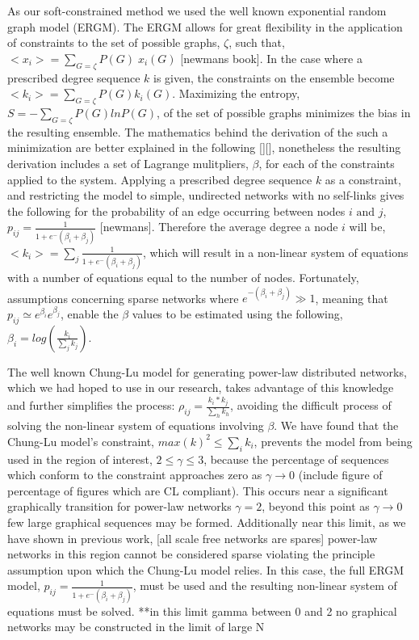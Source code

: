 \documentclass[aip,graphicx,amsmath]{revtex4-1}
\begin{document}
As our soft-constrained method we used the well known exponential random graph model (ERGM). The ERGM allows for great flexibility in the application of constraints to the set of possible graphs, $\zeta$, such that, $<x_i> = \displaystyle\sum_{G = \zeta} P(G)\;x_i(G)$ [newmans book]. In the case where a prescribed degree sequence $k$ is given, the constraints on the ensemble become $<k_i> = \displaystyle\sum_{G = \zeta} P(G) k_i(G)$. Maximizing the entropy, $S = -\displaystyle\sum_{G = \zeta} P(G) ln P(G)$, of the set of possible graphs minimizes the bias in the resulting ensemble. The mathematics behind the derivation of the such a minimization are better explained in the following [][], nonetheless the resulting derivation includes a set of Lagrange mulitpliers, $\beta$, for each of the constraints applied to the system. Applying a prescribed degree sequence $k$ as a constraint, and restricting the model to simple, undirected networks with no self-links gives the following for the probability of an edge occurring between nodes $i \text{ and } j$, $p_{ij}  =  \frac{1}{1+e^-(\beta_i + \beta_j)}$ [newmans]. Therefore the average degree a node $i$ will be, $<k_i> = \displaystyle\sum_{j} \frac{1}{1+e^-(\beta_i + \beta_j)}$, which will result in a non-linear system of equations with a number of equations equal to the number of nodes. Fortunately, assumptions concerning sparse networks where $e^{-(\beta_i + \beta_j)} \gg 1$, meaning that $p_{ij} \simeq e^{\beta_i}e^{\beta_j}$, enable the $\beta$ values to be estimated using the following, $\beta_i=log(\frac{k_i}{\sum_j{k_j}})$. 

The well known Chung-Lu model for generating power-law distributed networks, which we had hoped to use in our research, takes advantage of this knowledge and further simplifies the process: $\rho_{ij}=\frac{k_i*k_j}{\sum_h{k_h}}$, avoiding the difficult process of solving the non-linear system of equations involving $\beta$. We have found that the Chung-Lu model's constraint, $max(k)^2\leq\sum_i{k_i}$, prevents the model from being used in the region of interest, $2\leq\gamma\leq3$, because the percentage of sequences which conform to the constraint approaches zero as $\gamma\to0$ (include figure of percentage of figures which are CL compliant). This occurs near a significant graphically transition for power-law networks $\gamma=2$, beyond this point as $\gamma\to0$ few large graphical sequences may be formed. Additionally near this limit, as we have shown in previous work, [all scale free networks are spares] power-law networks in this region cannot be considered sparse violating the principle assumption upon which the Chung-Lu model relies. In this case, the full ERGM model, $p_{ij}  =  \frac{1}{1+e^-(\beta_i + \beta_j)}$, must be used and the resulting non-linear system of equations must be solved. **in this limit gamma between 0 and 2 no graphical networks may be constructed in the limit of large N
\end{document}
